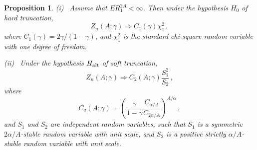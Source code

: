 \documentclass[11pt]{amsart}
\newtheorem{prop}{Proposition}[section]
\numberwithin{equation}{section}
\begin{document}
\begin{prop}\label{prop:test2} (i) \ Assume that $ER_1^{2A}<\infty$. Then
  under the hypothesis $H_0$   of hard truncation,
\begin{equation} \label{e:test2.h0}
Z_n(A;\gamma)\Rightarrow C_1(\gamma) \chi_1^2\,,
\end{equation}
where $C_1(\gamma)=2\gamma/(1-\gamma)$,
and $\chi_1^2$ is the standard chi-square random variable with one
degree of freedom.

(ii) \ Under the hypothesis $H_{\rm alt}$ of soft truncation,
\begin{equation} \label{e:test2.h1}
Z_n(A;\gamma)\Rightarrow C_2(A;\gamma) \frac{S_1^2}{S_2}\,,
\end{equation}
where
$$
C_2(A;\gamma)=\left(
\frac{\gamma}{1-\gamma}\frac{C_{\alpha/A}}{C_{2\alpha/A}}
\right)^{A/\alpha}\,,
$$
and $S_1$ and $S_2$ are independent
random variables, such that $S_1$ is a symmetric $2\alpha/A$-stable
random variable with unit scale, and $S_2$ is a positive strictly
$\alpha/A$-stable random variable with unit scale.
\end{prop}
\end{document}

